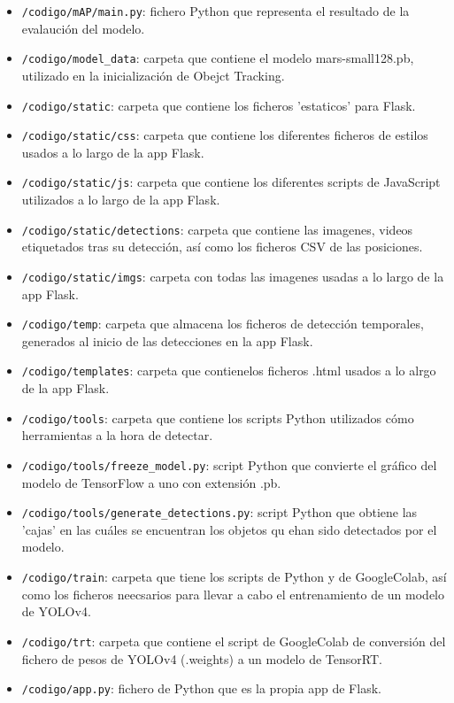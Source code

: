 \begin{itemize}
    \item \texttt{/codigo/mAP/main.py}: fichero Python que representa el resultado de la evalaución del modelo.
    \item \texttt{/codigo/model\_data}: carpeta que contiene el modelo mars-small128.pb, utilizado en la inicialización de Obejct Tracking.
    \item \texttt{/codigo/static}: carpeta que contiene los ficheros 'estaticos' para Flask.
    \item \texttt{/codigo/static/css}: carpeta que contiene los diferentes ficheros de estilos\cite{css} usados a lo largo de la app Flask.
    \item \texttt{/codigo/static/js}: carpeta que contiene los diferentes scripts de JavaScript\cite{js} utilizados a lo largo de la app Flask.
    \item \texttt{/codigo/static/detections}: carpeta que contiene las imagenes, videos etiquetados tras su detección, así como los ficheros CSV de las posiciones.
    \item \texttt{/codigo/static/imgs}: carpeta con todas las imagenes usadas a lo largo de la app Flask.
    \item \texttt{/codigo/temp}: carpeta que almacena los ficheros de detección temporales, generados al inicio de las detecciones en la app Flask.
    \item \texttt{/codigo/templates}: carpeta que contienelos ficheros .html usados a lo alrgo de la app Flask.
    \item \texttt{/codigo/tools}: carpeta que contiene los scripts Python utilizados cómo herramientas a la hora de detectar.
    \item \texttt{/codigo/tools/freeze\_model.py}: script Python que convierte el gráfico del modelo de TensorFlow a uno con extensión .pb.
    \item \texttt{/codigo/tools/generate\_detections.py}: script Python que obtiene las 'cajas' en las cuáles se encuentran los objetos qu ehan sido detectados por el modelo.
    \item \texttt{/codigo/train}: carpeta que tiene los scripts de Python y de GoogleColab, así como los ficheros neecsarios para llevar a cabo el entrenamiento de un modelo de YOLOv4.
    \item \texttt{/codigo/trt}: carpeta que contiene el script de GoogleColab de conversión del fichero de pesos de YOLOv4 (.weights) a un modelo de TensorRT.
    \item \texttt{/codigo/app.py}: fichero de Python que es la propia app de Flask.

\end{itemize}
